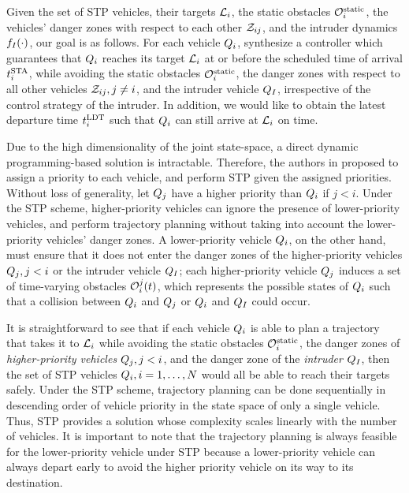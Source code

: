 Given the set of STP vehicles, their targets $\mathcal{L}_i$, the static obstacles $\mathcal{O}^\text{static}_i$, the vehicles' danger zones with respect to each other $\mathcal{Z}_{ij}$, and the intruder dynamics $f_I(\cdot)$, our goal is as follows. For each vehicle $Q_i$, synthesize a controller which guarantees that $Q_i$ reaches its target $\mathcal{L}_i$ at or before the scheduled time of arrival $t^\text{STA}_i$, while avoiding the static obstacles $\mathcal{O}^\text{static}_i$, the danger zones with respect to all other vehicles $\mathcal{Z}_{ij}, j\neq i$, and the intruder vehicle $Q_{I}$, irrespective of the control strategy of the intruder. In addition, we would like to obtain the latest departure time $t^\text{LDT}_i$ such that $Q_i$ can still arrive at $\mathcal{L}_i$ on time.

Due to the high dimensionality of the joint state-space, a direct dynamic programming-based solution is intractable. Therefore, the authors in \cite{Chen15c} proposed to assign a priority to each vehicle, and perform STP given the assigned priorities. Without loss of generality, let $Q_j$ have a higher priority than $Q_i$ if $j<i$. Under the STP scheme, higher-priority vehicles can ignore the presence of lower-priority vehicles, and perform trajectory planning without taking into account the lower-priority vehicles' danger zones. A lower-priority vehicle $Q_i$, on the other hand, must ensure that it does not enter the danger zones of the higher-priority vehicles $Q_j, j<i$ or the intruder vehicle $Q_{I}$; each higher-priority vehicle $Q_j$ induces a set of time-varying obstacles $\mathcal{O}_i^j(t)$, which represents the possible states of $Q_i$ such that a collision between $Q_i$ and $Q_j$ or $Q_i$ and $Q_{I}$ could occur.

It is straightforward to see that if each vehicle $Q_i$ is able to plan a trajectory that takes it to $\mathcal{L}_i$ while avoiding the static obstacles $\mathcal{O}^\text{static}_i$, the danger zones of \textit{higher-priority vehicles} $Q_j, j<i$, and the danger zone of the \textit{intruder} $Q_{I}$, then the set of STP vehicles $Q_i, i=1,\ldots,N$ would all be able to reach their targets safely. Under the STP scheme, trajectory planning can be done sequentially in descending order of vehicle priority in the state space of only a single vehicle. Thus, STP provides a solution whose complexity scales linearly with the number of vehicles. It is important to note that the trajectory planning is always feasible for the lower-priority vehicle under STP because a lower-priority vehicle can always depart early to avoid the higher priority vehicle on its way to its destination.

